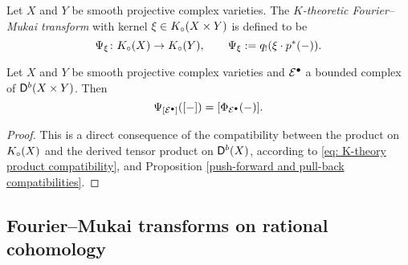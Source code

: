 
\begin{definition}
    Let $X$ and $Y$ be smooth projective complex varieties. The \emph{$K$-theoretic Fourier--Mukai transform} with kernel $\xi \in K_{\circ}(X \times Y)$ is defined to be
    \[
        \Psi_{\xi} \colon K_{\circ}(X) \to K_{\circ}(Y), \qquad \Psi_{\xi} := q_!(\xi \cdot p^*(-)).
    \]
\end{definition}

\begin{corollary}
    \emph{\cite[\S 5.2]{huybrechts2006fouriermukai}}
    Let $X$ and $Y$ be smooth projective complex varieties and $\mathcal E^\bullet$ a bounded complex of $\mathsf{D}^b(X \times Y)$. Then
    \[
        \Psi_{[\mathcal E^\bullet]}([-]) = [\Phi_{\mathcal E^\bullet}(-)].
    \]
\end{corollary}

\begin{proof}
    This is a direct consequence of the compatibility between the product on $K_{\circ}(X)$ and the derived tensor product on $\mathsf{D}^b(X)$, according to \eqref{eq: K-theory product compatibility}, and Proposition \ref{push-forward and pull-back compatibilities}.
\end{proof}

\subsection{Fourier--Mukai transforms on rational cohomology}
\label{Subsection: FM transform on cohomology}

